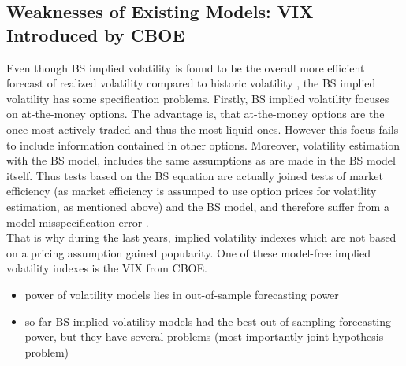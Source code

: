 \subsection{Weaknesses of Existing Models: VIX Introduced by CBOE}
Even though BS implied volatility is found to be the overall more efficient forecast of realized volatility compared to historic volatility \parencite{jiang2003}, the \gls{BS} implied volatility has some specification problems. Firstly, \gls{BS} implied volatility focuses on at-the-money options. The advantage is, that at-the-money options are the once most actively traded and thus the most liquid ones. However this focus fails to include information contained in other options. Moreover, volatility estimation with the \gls{BS} model, includes the same assumptions as are made in the \gls{BS} model itself. Thus tests based on the \gls{BS} equation are actually joined tests of market efficiency (as market efficiency is assumped to use option prices for volatility estimation, as mentioned above) and the \gls{BS} model, and therefore suffer from a model misspecification error \parencite{jiang2003}. \\
That is why during the last years, implied volatility indexes which are not based on a pricing assumption gained popularity. One of these model-free implied volatility indexes is the VIX from CBOE.

\begin{itemize}\itemsep0pt
\item power of volatility models lies in out-of-sample forecasting power
\item so far \gls{BS} implied volatility models had the best out of sampling forecasting power, but they have several problems (most importantly joint hypothesis problem) 
\end{itemize}



